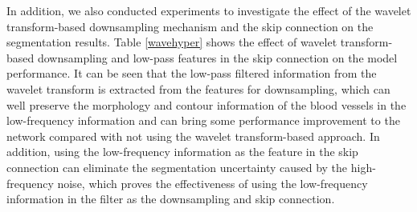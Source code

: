 \documentclass[a4paper,fleqn]{cas-dc}
\begin{document}
\begin{table}
  \begin{minipage}[p]{0.5\linewidth}
  \centering
  \end{minipage}
  \begin{minipage}[p]{0.45\linewidth} 
	\centering 
  \end{minipage}
  \caption{The effect of hyperparameters of $\theta$ and $\alpha$ in the
loss function on the segmentation performance. Abnormal indicators are replaced with horizontal lines.} 
  \label{losshyper}
  \end{table}

In addition, we also conducted experiments to investigate the effect of the wavelet transform-based downsampling mechanism and the skip connection on the segmentation results. Table \ref{wavehyper} shows the effect of wavelet transform-based downsampling and low-pass features in the skip connection on the model performance. It can be seen that the low-pass filtered information from the wavelet transform is extracted from the features for downsampling, which can well preserve the morphology and contour information of the blood vessels in the low-frequency information and can bring some performance improvement to the network compared with not using the wavelet transform-based approach. In addition, using the low-frequency information as the feature in the skip connection can eliminate the segmentation uncertainty caused by the high-frequency noise, which proves the effectiveness of using the low-frequency information in the filter as the downsampling and skip connection.
\end{document}
